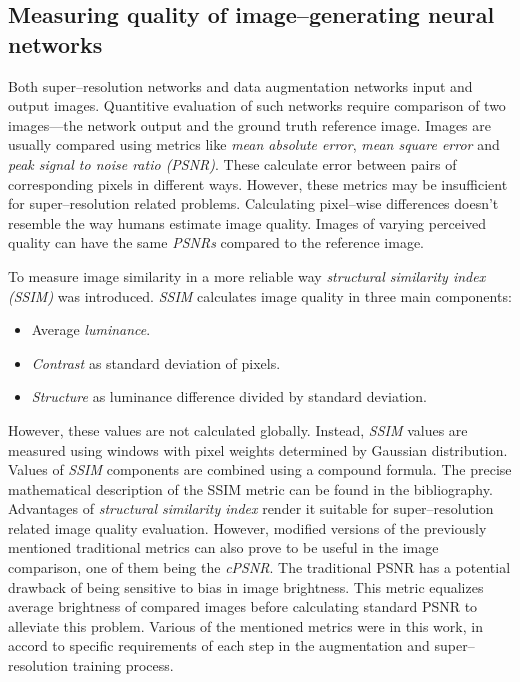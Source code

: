 \subsection{Measuring quality of image--generating neural networks}

Both super--resolution networks and data augmentation networks input and output images.
Quantitive evaluation of such networks require comparison of two images---the network output and the ground truth reference image.
Images are usually compared using metrics like \textit{mean absolute error}, \textit{mean square error} and \textit{peak signal to noise ratio (PSNR)}.
These calculate error between pairs of corresponding pixels in different ways.
However, these metrics may be insufficient for super--resolution related problems.
Calculating pixel--wise differences doesn't resemble the way humans estimate image quality.
Images of varying perceived quality can have the same \textit{PSNRs} compared to the reference image.

To measure image similarity in a more reliable way \textit{structural similarity index (SSIM)} \cite{wang-2004-ssim} was introduced.
\textit{SSIM} calculates image quality in three main components:
\begin{itemize}
	\item Average \textit{luminance}.
	\item \textit{Contrast} as standard deviation of pixels.
	\item \textit{Structure} as luminance difference divided by standard deviation.
\end{itemize}
However, these values are not calculated globally.
Instead, \textit{SSIM} values are measured using windows with pixel weights determined by Gaussian distribution.
Values of \textit{SSIM} components are combined using a compound formula.
The precise mathematical description of the SSIM metric can be found in the bibliography.
Advantages of \textit{structural similarity index} render it suitable for super--resolution related image quality evaluation.
However, modified versions of the previously mentioned traditional metrics can also prove to be useful in the image comparison, one of them being the \textit{cPSNR}.
The traditional PSNR has a potential drawback of being sensitive to bias in image brightness.
This metric equalizes average brightness of compared images before calculating standard PSNR to alleviate this problem.
Various of the mentioned metrics were in this work, in accord to specific requirements of each step in the augmentation and super--resolution training process.

